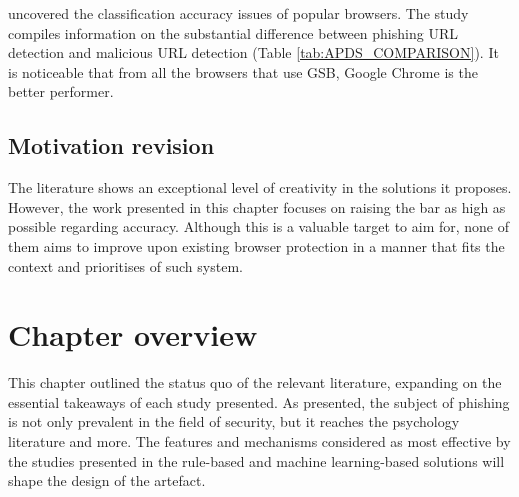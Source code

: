 {\parindent0pt uncovered the classification accuracy issues of popular browsers. The study compiles information on the substantial difference between phishing URL detection and malicious URL detection (Table \ref{tab:APDS_COMPARISON}). It is noticeable that from all the browsers that use GSB, Google Chrome is the better performer.}

\subsection{Motivation revision}
\label{subsec:motivation_revision}
The literature shows an exceptional level of creativity in the solutions it proposes. However, the work presented in this chapter focuses on raising the bar as high as possible regarding accuracy. Although this is a valuable target to aim for, none of them aims to improve upon existing browser protection in a manner that fits the context and prioritises of such system.


\section{Chapter overview}
This chapter outlined the status quo of the relevant literature, expanding on the essential takeaways of each study presented. As presented, the subject of phishing is not only prevalent in the field of security, but it reaches the psychology literature and more. The features and mechanisms considered as most effective by the studies presented in the rule-based and machine learning-based solutions will shape the design of the artefact.

